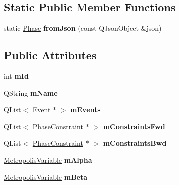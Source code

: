 \subsection*{Static Public Member Functions}
\begin{DoxyCompactItemize}
\item 
\hypertarget{class_phase_abb5c8636c9f8815e893fb842aca9c990}{static \hyperlink{class_phase}{Phase} {\bfseries from\-Json} (const Q\-Json\-Object \&json)}\label{class_phase_abb5c8636c9f8815e893fb842aca9c990}

\end{DoxyCompactItemize}
\subsection*{Public Attributes}
\begin{DoxyCompactItemize}
\item 
\hypertarget{class_phase_a72047fa4d4314c9bc41aab51bbf036d8}{int {\bfseries m\-Id}}\label{class_phase_a72047fa4d4314c9bc41aab51bbf036d8}

\item 
\hypertarget{class_phase_acd43c95ddf8c0ad782e9411a2ff93bac}{Q\-String {\bfseries m\-Name}}\label{class_phase_acd43c95ddf8c0ad782e9411a2ff93bac}

\item 
\hypertarget{class_phase_a75816bdc5589b871414d098edcfea8b0}{Q\-List$<$ \hyperlink{class_event}{Event} $\ast$ $>$ {\bfseries m\-Events}}\label{class_phase_a75816bdc5589b871414d098edcfea8b0}

\item 
\hypertarget{class_phase_a3585415a643ae1d36b0d047b4b4a973e}{Q\-List$<$ \hyperlink{class_phase_constraint}{Phase\-Constraint} $\ast$ $>$ {\bfseries m\-Constraints\-Fwd}}\label{class_phase_a3585415a643ae1d36b0d047b4b4a973e}

\item 
\hypertarget{class_phase_ad9f6a4c027ae1cc91bb8c13a97d03336}{Q\-List$<$ \hyperlink{class_phase_constraint}{Phase\-Constraint} $\ast$ $>$ {\bfseries m\-Constraints\-Bwd}}\label{class_phase_ad9f6a4c027ae1cc91bb8c13a97d03336}

\item 
\hypertarget{class_phase_a80e272874c7cd53384077ea972a57e23}{\hyperlink{class_metropolis_variable}{Metropolis\-Variable} {\bfseries m\-Alpha}}\label{class_phase_a80e272874c7cd53384077ea972a57e23}

\item 
\hypertarget{class_phase_ad876588d6d633dc40f5e4d4493cca7fd}{\hyperlink{class_metropolis_variable}{Metropolis\-Variable} {\bfseries m\-Beta}}\label{class_phase_ad876588d6d633dc40f5e4d4493cca7fd}


\end{DoxyCompactItemize}
